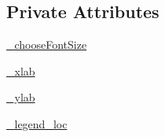 \subsection*{Private Attributes}
\begin{DoxyCompactItemize}
\item 
\hyperlink{class_mu_mo_t_1_1_mu_mo_t_1_1_mu_mo_ttime_evolution_view_a6a353a1ef9443ae375948d592ed6cec6}{\+\_\+choose\+Font\+Size}
\item 
\hyperlink{class_mu_mo_t_1_1_mu_mo_t_1_1_mu_mo_ttime_evolution_view_a865b2109ba10d874e84d4a354873b121}{\+\_\+xlab}
\item 
\hyperlink{class_mu_mo_t_1_1_mu_mo_t_1_1_mu_mo_ttime_evolution_view_aac1a25a634d53e524573f67eb5f3a7b9}{\+\_\+ylab}
\item 
\hyperlink{class_mu_mo_t_1_1_mu_mo_t_1_1_mu_mo_ttime_evolution_view_a11488f79e0409b71b0bb257c81ae4687}{\+\_\+legend\+\_\+loc}
\end{DoxyCompactItemize}
